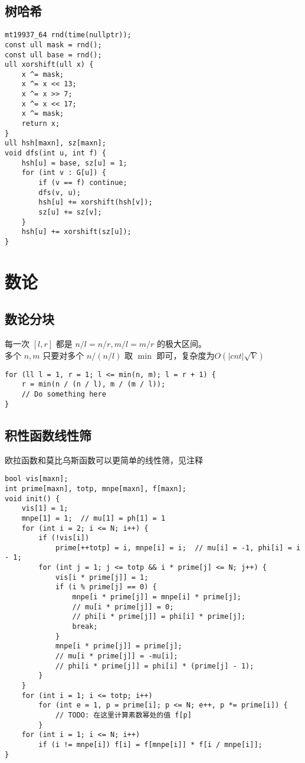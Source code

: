 \documentclass[twoside]{article}
\begin{document}
\subsection{树哈希}
\begin{lstlisting}
mt19937_64 rnd(time(nullptr));
const ull mask = rnd();
const ull base = rnd();
ull xorshift(ull x) {
	x ^= mask;
	x ^= x << 13;
	x ^= x >> 7;
	x ^= x << 17;
	x ^= mask;
	return x;
}
ull hsh[maxn], sz[maxn];
void dfs(int u, int f) {
	hsh[u] = base, sz[u] = 1;
	for (int v : G[u]) {
		if (v == f) continue;
		dfs(v, u);
		hsh[u] += xorshift(hsh[v]);
		sz[u] += sz[v];
	}
	hsh[u] += xorshift(sz[u]);
}\end{lstlisting}
\clearpage\section{数论}
\subsection{数论分块}
\noindent 每一次 $[l,r]$ 都是 $n/l = n/r , m/l = m/r$ 的极大区间。\\
多个 $n, m$ 只要对多个 $n/(n/l)$ 取 $\min$ 即可，复杂度为$O(|cnt|\sqrt V)$
\begin{lstlisting}
for (ll l = 1, r = 1; l <= min(n, m); l = r + 1) {
	r = min(n / (n / l), m / (m / l));
	// Do something here
}\end{lstlisting}
\subsection{积性函数线性筛}
欧拉函数和莫比乌斯函数可以更简单的线性筛，见注释
\begin{lstlisting}
bool vis[maxn];
int prime[maxn], totp, mnpe[maxn], f[maxn];
void init() {
	vis[1] = 1;
	mnpe[1] = 1;  // mu[1] = ph[1] = 1
	for (int i = 2; i <= N; i++) {
		if (!vis[i])
			prime[++totp] = i, mnpe[i] = i;  // mu[i] = -1, phi[i] = i - 1;
		for (int j = 1; j <= totp && i * prime[j] <= N; j++) {
			vis[i * prime[j]] = 1;
			if (i % prime[j] == 0) {
				mnpe[i * prime[j]] = mnpe[i] * prime[j];
				// mu[i * prime[j]] = 0;
				// phi[i * prime[j]] = phi[i] * prime[j];
				break;
			}
			mnpe[i * prime[j]] = prime[j];
			// mu[i * prime[j]] = -mu[i];
			// phi[i * prime[j]] = phi[i] * (prime[j] - 1);
		}
	}
	for (int i = 1; i <= totp; i++)
		for (int e = 1, p = prime[i]; p <= N; e++, p *= prime[i]) {
			// TODO: 在这里计算素数幂处的值 f[p]
		}
	for (int i = 1; i <= N; i++)
		if (i != mnpe[i]) f[i] = f[mnpe[i]] * f[i / mnpe[i]];
}\end{lstlisting}
\end{document}
